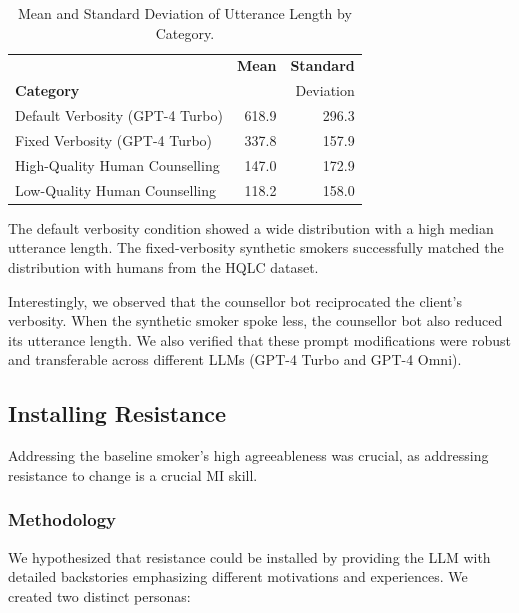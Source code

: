 \begin{table}[ht]
\centering

\label{tab:utterance_stats}
\begin{tabular}{lrr}
\toprule
{} &  \textbf{Mean} &  \textbf{Standard} \\
\textbf{Category}                   &                        &           {Deviation}          \\
\midrule
Default Verbosity (GPT-4 Turbo) &                  618.9 &               296.3 \\
Fixed Verbosity (GPT-4 Turbo)   &                  337.8 &               157.9 \\
High-Quality Human Counselling             &                  147.0 &               172.9 \\
Low-Quality Human Counselling            &                  118.2 &               158.0 \\
\bottomrule
\end{tabular}
\caption{Mean and Standard Deviation of Utterance Length by Category.}
\end{table}

The default verbosity condition showed a wide distribution with a high median utterance length. The fixed-verbosity synthetic smokers successfully matched the distribution with humans from the HQLC dataset.

Interestingly, we observed that the counsellor bot reciprocated the client's verbosity. When the synthetic smoker spoke less, the counsellor bot also reduced its utterance length. We also verified that these prompt modifications were robust and transferable across different LLMs (GPT-4 Turbo and GPT-4 Omni).

\subsection{Installing Resistance}
\label{sec:synthetic-smoker-resistance}

Addressing the baseline smoker's high agreeableness was crucial, as addressing resistance to change is a crucial MI skill.

\subsubsection{Methodology}
We hypothesized that resistance could be installed by providing the LLM with detailed backstories emphasizing different motivations and experiences. We created two distinct personas:

